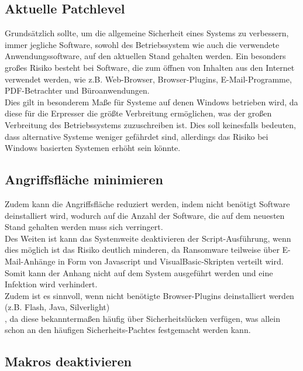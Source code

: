 \subsection{Aktuelle Patchlevel}

	 Grundsätzlich sollte, um die allgemeine Sicherheit eines Systems zu verbessern, immer jegliche Software, sowohl des Betriebssystem wie auch die verwendete Anwendungssoftware, auf den aktuellen Stand gehalten werden. Ein besonders großes Risiko besteht bei Software, die zum öffnen von Inhalten aus den Internet verwendet werden, wie z.B. Web-Browser, Browser-Plugins, E-Mail-Programme, PDF-Betrachter und Büroanwendungen. \cite{bsi:ransome}\\
	 
	 Dies gilt in besonderem Maße für Systeme auf denen Windows betrieben wird, da diese für die Erpresser die größte Verbreitung ermöglichen, was der großen Verbreitung des Betriebssystems zuzuschreiben ist. Dies soll keinesfalls bedeuten, dass alternative Systeme weniger gefährdet sind, allerdings das Risiko bei Windows basierten Systemen erhöht sein könnte.
	 
\subsection{Angriffsfläche minimieren}

	Zudem kann die Angriffsfläche reduziert werden, indem nicht benötigt Software deinstalliert wird, wodurch auf die Anzahl der Software, die auf dem neuesten Stand gehalten werden muss sich verringert.\\
	
	Des Weiten ist kann das Systemweite deaktivieren der Script-Ausführung, wenn dies möglich ist das Risiko deutlich minderen, da Ransomware teilweise über E-Mail-Anhänge in Form von Javascript und VisualBasic-Skripten verteilt wird. Somit kann der Anhang nicht auf dem System ausgeführt werden und eine Infektion wird verhindert. \cite{bsi:ransome}\\
	
	Zudem ist es sinnvoll, wenn nicht benötigte Browser-Plugins deinstalliert werden (z.B. Flash, Java, Silverlight) \cite{bsi:ransome}\\, da diese bekanntermaßen häufig über Sicherheitslücken verfügen, was allein schon an den häufigen Sicherheits-Pachtes festgemacht werden kann.  
	
\subsection{Makros deaktivieren}

